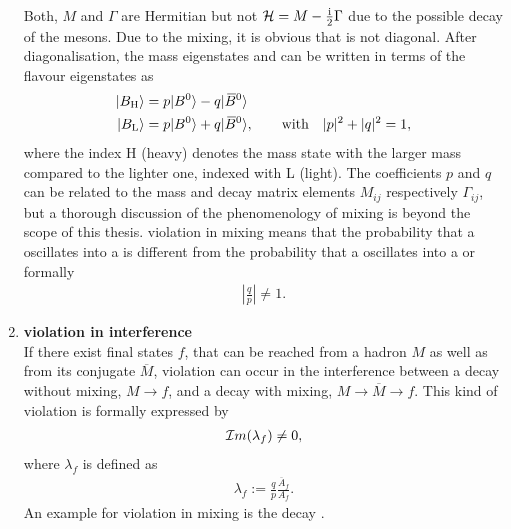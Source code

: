 \begin{enumerate}
          Both, $M$ and $\Gamma$ are Hermitian but not $\mathcal{H} = M - \frac{\mathrm{i}}{2} \Gamma$ due to the possible decay of the mesons.
          Due to the mixing, it is obvious that \Ham is not diagonal.
          After diagonalisation, the mass eigenstates  and  can be written in terms of the flavour eigenstates as
          \begin{align}
              \ket{B_{\text{H}}\vphantom{\text{\Bdb}}} &= p \ket{\text{\Bd}\vphantom{\text{\Bdb}}} - q \ket{\text{\Bdb}} \label{eq:b_heavy}\\ 
              \ket{B_{\text{L}}\vphantom{\text{\Bdb}}} &= p \ket{\text{\Bd}\vphantom{\text{\Bdb}}} + q \ket{\text{\Bdb}}, \qquad \text{with} \quad |p|^2 + |q|^2 = 1, \label{eq:b_light}
          \end{align}
          where the index H (heavy) denotes the mass state with the larger mass compared to the lighter one, indexed with L (light).
          The coefficients $p$ and $q$ can be related to the mass and decay matrix elements $M_{ij}$ respectively $\Gamma_{ij}$, but a thorough discussion of the phenomenology of mixing is beyond the scope of this thesis.
          \CP violation in mixing means that the probability that a \Bd oscillates into a \Bdb is different from the probability that a \Bdb oscillates into a \Bd or formally
          \begin{align}
              \left|\frac{q}{p}\right| \neq 1.
          \end{align}
    \item \textbf{\CP violation in interference} \\
          If there exist final states $f$, that can be reached from a hadron $M$ as well as from its \CP conjugate $\overline{M}$, \CP violation can occur in the interference between a decay without mixing, $M \to f$, and a decay with mixing, $M \to \overline{M} \to f$.
          This kind of \CP violation is formally expressed by
          \begin{align}
              \mathcal{I}m(\lambda_f) \neq 0,
          \end{align}
          where $\lambda_f$ is defined as
          \begin{align}
              \lambda_f := \frac{q}{p} \frac{\overline{A}_f}{A_f}.
          \end{align}
          An example for \CP violation in mixing is the decay \decay{\Bd/\Bdb}{\jpsi\KS}.
\end{enumerate}

